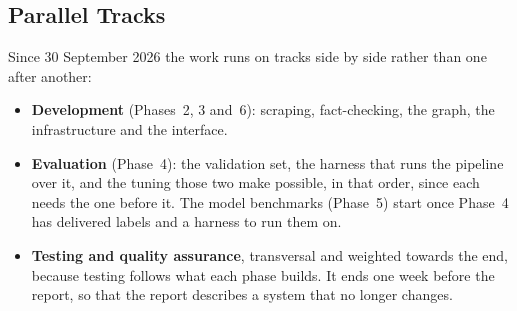 
\subsection{Parallel Tracks}
\label{subsec:tracks}

Since 30 September 2026 the work runs on tracks side by side rather
than one after another:

\begin{itemize}
    \item \textbf{Development} (Phases~2, 3 and~6): scraping,
    fact-checking, the graph, the infrastructure and the interface.
    \item \textbf{Evaluation} (Phase~4): the validation set, the
    harness that runs the pipeline over it, and the tuning those two
    make possible, in that order, since each needs the one before it.
    The model benchmarks (Phase~5) start once Phase~4 has delivered
    labels and a harness to run them on.
    \item \textbf{Testing and quality assurance}, transversal and
    weighted towards the end, because testing follows what each phase
    builds. It ends one week before the report, so that the report
    describes a system that no longer changes.
\end{itemize}
